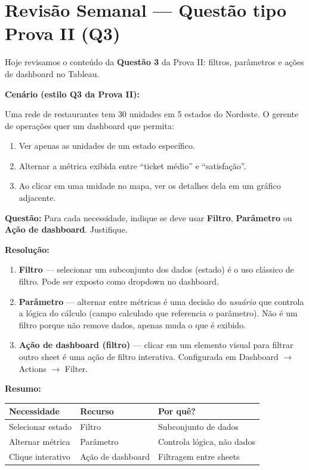 \section{Revisão Semanal — Questão tipo Prova II (Q3)}

\begin{NoteBox}
Hoje revisamos o conteúdo da \textbf{Questão 3} da Prova II:
filtros, parâmetros e ações de dashboard no Tableau.
\end{NoteBox}

\begin{SolvedBox}
\textbf{Cenário (estilo Q3 da Prova II):}

Uma rede de restaurantes tem 30 unidades em 5 estados do Nordeste.
O gerente de operações quer um dashboard que permita:
\begin{enumerate}
  \item Ver apenas as unidades de um estado específico.
  \item Alternar a métrica exibida entre ``ticket médio'' e ``satisfação''.
  \item Ao clicar em uma unidade no mapa, ver os detalhes dela em um
  gráfico adjacente.
\end{enumerate}

\textbf{Questão:} Para cada necessidade, indique se deve usar
\textbf{Filtro}, \textbf{Parâmetro} ou \textbf{Ação de dashboard}.
Justifique.

\textbf{Resolução:}
\begin{enumerate}
  \item \textbf{Filtro} — selecionar um subconjunto dos dados (estado)
  é o uso clássico de filtro. Pode ser exposto como dropdown no dashboard.
  \item \textbf{Parâmetro} — alternar entre métricas é uma decisão do
  \emph{usuário} que controla a lógica do cálculo (campo calculado que
  referencia o parâmetro). Não é um filtro porque não remove dados,
  apenas muda o que é exibido.
  \item \textbf{Ação de dashboard (filtro)} — clicar em um elemento
  visual para filtrar outro sheet é uma ação de filtro interativa.
  Configurada em Dashboard $\to$ Actions $\to$ Filter.
\end{enumerate}

\textbf{Resumo:}
\begin{center}
\begin{tabular}{|l|l|l|}
\hline
\textbf{Necessidade} & \textbf{Recurso} & \textbf{Por quê?} \\
\hline
Selecionar estado & Filtro & Subconjunto de dados \\
Alternar métrica & Parâmetro & Controla lógica, não dados \\
Clique interativo & Ação de dashboard & Filtragem entre sheets \\
\hline
\end{tabular}
\end{center}
\end{SolvedBox}

